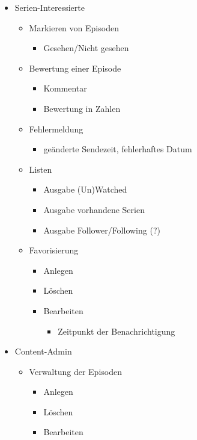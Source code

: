 \documentclass[a4paper]{article}
\begin{document}
\begin{itemize}
\item
Serien-Interessierte
	\begin{itemize}
	\item
    Markieren von Episoden
    	\begin{itemize}
    	\item
     	Gesehen/Nicht gesehen
     	\end{itemize}
    \item
    Bewertung einer Episode
      	\begin{itemize}
      	\item
        Kommentar
        \item
        Bewertung in Zahlen
        \end{itemize}
     \item
     Fehlermeldung
     	\begin{itemize}
     	\item
        geänderte Sendezeit, fehlerhaftes Datum
        \end{itemize}
     \item
     Listen
     	\begin{itemize}
     	\item
    	Ausgabe (Un)Watched
    	\item
     	Ausgabe vorhandene Serien
     	\item
     	Ausgabe Follower/Following (?)
     	\end{itemize}
     \item
     Favorisierung
   	  	\begin{itemize}
   	  	\item
   	  	Anlegen
   	  	\item
   	  	Löschen
   	  	\item
   	  	Bearbeiten
   	  		\begin{itemize}
   	  		\item
   	  	    Zeitpunkt der Benachrichtigung
   	  	    \end{itemize}
		\end{itemize}
	\end{itemize}
	\item
	Content-Admin
		\begin{itemize}
		\item
		Verwaltung der Episoden
			\begin{itemize}
			\item
			Anlegen
			\item
			Löschen
			\item
			Bearbeiten
			\end{itemize}
		\end{itemize}
\end{itemize}
\end{document}
